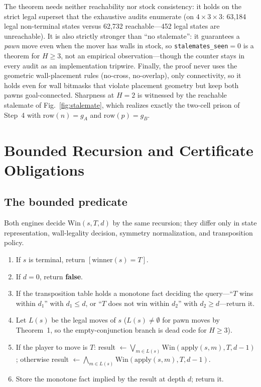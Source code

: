 \documentclass[conference]{IEEEtran}
\newcommand{\varSpec}[3]{$#1{\times}#2{\times}#3$}
\begin{document}
The theorem needs neither reachability nor stock consistency: it holds on the strict legal superset that the exhaustive audits enumerate (on \varSpec{4}{3}{3}: 63{,}184 legal non-terminal states versus 62{,}732 reachable---452 legal states are unreachable). It is also strictly stronger than ``no stalemate'': it guarantees a \emph{pawn} move even when the mover has walls in stock, so \texttt{stalemates\_seen}${}=0$ is a theorem for $H\geq 3$, not an empirical observation---though the counter stays in every audit as an implementation tripwire. Finally, the proof never uses the geometric wall-placement rules (no-cross, no-overlap), only connectivity, so it holds even for wall bitmasks that violate placement geometry but keep both pawns goal-connected. Sharpness at $H=2$ is witnessed by the reachable stalemate of Fig.~\ref{fig:stalemate}, which realizes exactly the two-cell prison of Step~4 with $\mathrm{row}(n)=g_A$ and $\mathrm{row}(p)=g_B$.

\section{Bounded Recursion and Certificate Obligations}
\label{app:pseudo}

\subsection{The bounded predicate}

Both engines decide $\mathrm{Win}(s,T,d)$ by the same recursion; they differ only in state representation, wall-legality decision, symmetry normalization, and transposition policy.

\begin{enumerate}[leftmargin=*]
\item If $s$ is terminal, return $[\text{winner}(s)=T]$.
\item If $d=0$, return \textbf{false}.
\item If the transposition table holds a monotone fact deciding the query---``$T$ wins within $d_1$'' with $d_1\leq d$, or ``$T$ does not win within $d_2$'' with $d_2\geq d$---return it.
\item Let $L(s)$ be the legal moves of $s$ ($L(s)\neq\emptyset$ for pawn moves by Theorem~1, so the empty-conjunction branch is dead code for $H\geq 3$).
\item If the player to move is $T$: result $\leftarrow \bigvee_{m\in L(s)}\mathrm{Win}(\mathrm{apply}(s,m),T,d-1)$; otherwise result $\leftarrow \bigwedge_{m\in L(s)}\mathrm{Win}(\mathrm{apply}(s,m),T,d-1)$.
\item Store the monotone fact implied by the result at depth $d$; return it.
\end{enumerate}
\end{document}
